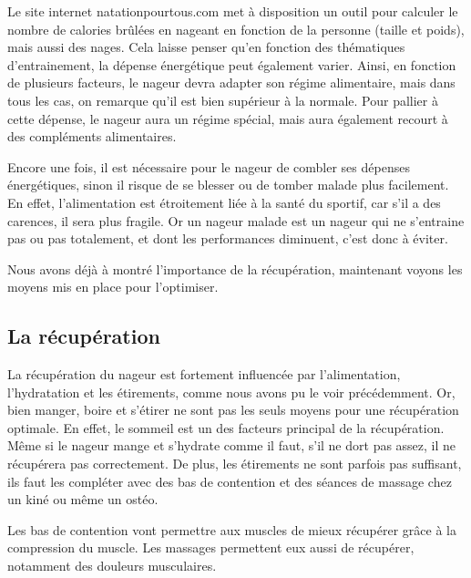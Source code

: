 Le site internet natationpourtous.com met à disposition un outil pour calculer le nombre de calories brûlées en nageant en fonction de la personne (taille et poids), mais aussi des nages. Cela laisse penser qu'en fonction des thématiques d'entrainement, la dépense énergétique peut également varier. Ainsi, en fonction de plusieurs facteurs, le nageur devra adapter son régime alimentaire, mais dans tous les cas, on remarque qu'il est bien supérieur à la normale. Pour pallier à cette dépense, le nageur aura un régime spécial, mais aura également recourt à des compléments alimentaires.

\vspace{12pt}

Encore une fois, il est nécessaire pour le nageur de combler ses dépenses énergétiques, sinon il risque de se blesser ou de tomber malade plus facilement. En effet, l'alimentation est étroitement liée à la santé du sportif, car s'il a des carences, il sera plus fragile. Or un nageur malade est un nageur qui ne s'entraine pas ou pas totalement, et dont les performances diminuent, c'est donc à éviter.

\vspace{12pt}

Nous avons déjà à montré l'importance de la récupération, maintenant voyons les moyens mis en place pour l'optimiser.


\subsection{La récupération}\label{la recup}

La récupération du nageur est fortement influencée par l'alimentation, l'hydratation et les étirements, comme nous avons pu le voir précédemment. Or, bien manger, boire et s'étirer ne sont pas les seuls moyens pour une récupération optimale. En effet, le sommeil est un des facteurs principal de la récupération. Même si le nageur mange et s'hydrate comme il faut, s'il ne dort pas assez, il ne récupérera pas correctement. De plus, les étirements ne sont parfois pas suffisant, ils faut les compléter avec des bas de contention et des séances de massage chez un kiné ou même un ostéo.

\vspace{12pt}

Les bas de contention vont permettre aux muscles de mieux récupérer grâce à la compression du muscle. Les massages permettent eux aussi de récupérer, notamment des douleurs musculaires.

